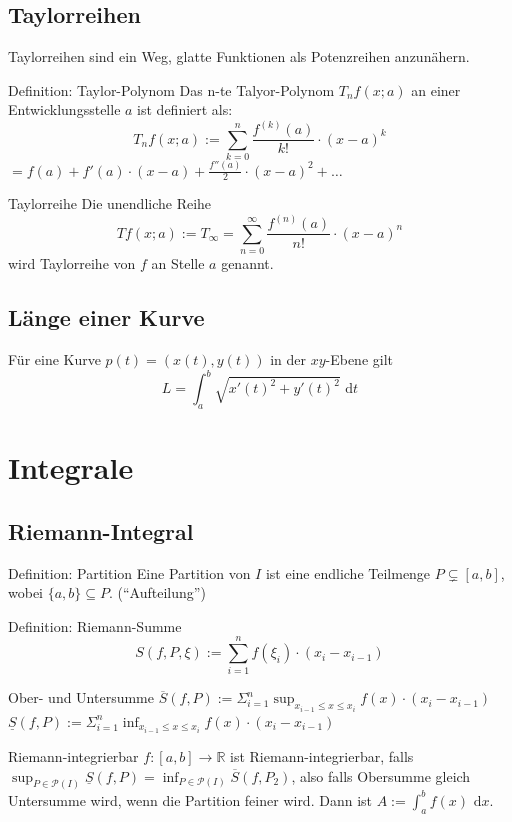 \documentclass[a4paper,10pt]{article}
\def\sumn{\sum_{n=0}^\infty}
\def\R{\mathbb{R}}
\def\dx{\text{ d}x}
\begin{document}
\subsection{Taylorreihen}
Taylorreihen sind ein Weg, glatte Funktionen als Potenzreihen anzunähern.

\begin{subbox}{Definition: Taylor-Polynom}
 Das n-te Talyor-Polynom $T_n f(x; a)$ an einer Entwicklungsstelle $a$ ist definiert als:
 $$T_n f(x; a) := \sum_{k=0}^{n} \frac{f^{(k)} (a)}{k!} \cdot (x - a)^k$$ 
 $ = f(a) + f'(a) \cdot (x-a) + \frac{f''(a)}{2} \cdot (x - a)^2 + \ldots$
\end{subbox}

\begin{mainbox}{Taylorreihe}
 Die unendliche Reihe
 $$Tf(x;a) := T_\infty = \sumn \frac{f^{(n)}(a)}{n!} \cdot (x-a)^n$$
 wird Taylorreihe von $f$ an Stelle $a$ genannt.
\end{mainbox}

\subsection{Länge einer Kurve}
Für eine Kurve $p(t) = (x(t), y(t))$ in der $xy$-Ebene gilt 
$$L = \int_a^b \sqrt{x'(t)^2+ y'(t)^2} \text{ d}t$$

\section{Integrale}
\subsection{Riemann-Integral}
\begin{subbox}{Definition: Partition}
 Eine Partition von $I$ ist eine endliche Teilmenge $P \subsetneq [a,b]$, wobei $\{a,b\} \subseteq P$. (``Aufteilung'')
\end{subbox}
\begin{mainbox}{Definition: Riemann-Summe}
 $$S(f, P, \xi) := \sum_{i=1}^n f(\xi_i) \cdot (x_i - x_{i-1})$$
\end{mainbox}
\begin{subbox}{Ober- und Untersumme}
 $\overline{S}(f,P) := \Sigma_{i=1}^{n} \sup_{x_{i-1} \leq x \leq x_i} f(x) \cdot (x_i - x_{i-1})$ \\
 $\underline{S}(f,P) := \Sigma_{i=1}^{n} \inf_{x_{i-1} \leq x \leq x_i} f(x) \cdot (x_i - x_{i-1})$
\end{subbox}
\begin{mainbox}{Riemann-integrierbar}
 $f:[a,b] \to \R$ ist Riemann-integrierbar, falls $\sup_{P \in \mathcal{P}(I)} \underline{S}(f,P) = \inf_{P \in \mathcal{P}(I)}\overline{S}(f, P_2)$, also falls Obersumme gleich Untersumme wird, wenn die Partition feiner wird. Dann ist $A := \int_a^b f(x)\dx$.
\end{mainbox}
\end{document}
